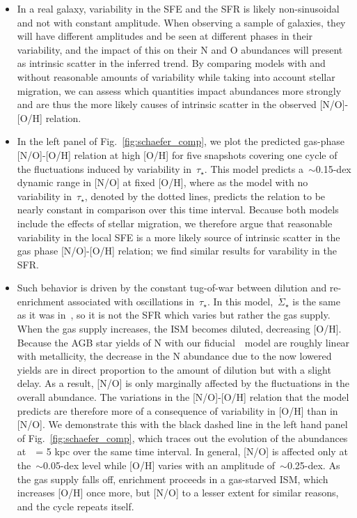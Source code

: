 \documentclass[ms.tex]{subfiles}
\begin{document}
\begin{itemize}
	\item In a real galaxy, variability in the SFE and the SFR is likely 
	non-sinusoidal and not with constant amplitude. 
	When observing a sample of galaxies, they will have different amplitudes
	and be seen at different phases in their variability, and the impact of
	this on their N and O abundances will present as intrinsic scatter in the
	inferred trend. 
	By comparing models with and without reasonable amounts of variability
	while taking into account stellar migration, we can assess which quantities
	impact abundances more strongly and are thus the more likely causes of
	intrinsic scatter in the observed [N/O]-[O/H] relation.

	\item In the left panel of Fig.~\ref{fig:schaefer_comp}, we plot the 
	predicted gas-phase [N/O]-[O/H] relation at high [O/H] for five snapshots 
	covering one cycle of the fluctuations induced by variability 
	in~$\tau_\star$. 
	This model predicts a~$\sim$0.15-dex dynamic range in [N/O] at fixed [O/H], 
	where as the model with no variability in~$\tau_\star$, denoted by the 
	dotted lines, predicts the relation to be nearly constant in comparison 
	over this time interval. 
	Because both models include the effects of stellar migration, we therefore 
	argue that reasonable variability in the local SFE is a more likely source 
	of intrinsic scatter in the gas phase [N/O]-[O/H] relation; we find 
	similar results for varability in the SFR. 

	\item Such behavior is driven by the constant tug-of-war between dilution 
	and re-enrichment associated with oscillations in~$\tau_\star$. 
	In this model,~$\dot{\Sigma}_\star$ is the same as it was 
	in~\citet{Johnson2021}, so it is not the SFR which varies but rather the 
	gas supply. 
	When the gas supply increases, the ISM becomes diluted, decreasing [O/H]. 
	Because the AGB star yields of N with our fiducial~\cristallo~model are 
	roughly linear with metallicity, the decrease in the N abundance due to the 
	now lowered yields are in direct proportion to the amount of dilution but 
	with a slight delay. 
	As a result, [N/O] is only marginally affected by the fluctuations in the 
	overall abundance. 
	The variations in the [N/O]-[O/H] relation that the model predicts are 
	therefore more of a consequence of variability in [O/H] than in [N/O]. 
	We demonstrate this with the black dashed line in the left hand panel of 
	Fig.~\ref{fig:schaefer_comp}, which traces out the evolution of the 
	abundances at~\rgal~= 5 kpc over the same time interval. 
	In general, [N/O] is affected only at the~$\sim$0.05-dex level while 
	[O/H] varies with an amplitude of~$\sim$0.25-dex. 
	As the gas supply falls off, enrichment proceeds in a gas-starved ISM, 
	which increases [O/H] once more, but [N/O] to a lesser extent for similar 
	reasons, and the cycle repeats itself. 


\end{itemize}
\end{document}
